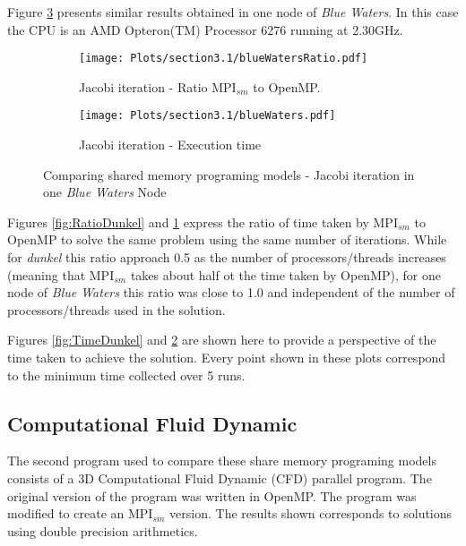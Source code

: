 Figure \ref{fig:Figure2} presents similar results obtained in one node of \emph{Blue Waters}. In this case the CPU is an AMD Opteron(TM) Processor 6276 running at 2.30GHz. 

\begin{figure} [h!]
    \centering
    \captionsetup{justification=raggedright, singlelinecheck=false}
    \begin{subfigure}{.6\textwidth}
      \hspace*{-1.5cm} 
      \texttt{[image: Plots/section3.1/blueWatersRatio.pdf]}
      \caption{Jacobi iteration - Ratio MPI$_{sm}$ to OpenMP.}
      \label{fig:RatioBW}
    \end{subfigure}%
    \begin{subfigure}{.6\textwidth}
      \hspace*{-1.5cm} 
      \texttt{[image: Plots/section3.1/blueWaters.pdf]}
      \caption{Jacobi iteration - Execution time}
      \label{fig:TimeBW}
    \end{subfigure}
\caption{Comparing shared memory programing models - Jacobi iteration in one \emph{Blue Waters} Node}
\label{fig:Figure2}
\end{figure}

\medskip


Figures \ref{fig:RatioDunkel} and \ref{fig:RatioBW} express the ratio of time taken by MPI$_{sm}$ to OpenMP to solve the same problem using the same number of iterations. While for \emph{dunkel} this ratio approach 0.5 as the number of processors/threads increases (meaning that MPI$_{sm}$ takes about half ot the time taken by OpenMP), for one node of \emph{Blue Waters} this ratio was close to 1.0 and independent of the number of processors/threads used in the solution.

\medskip

Figures \ref{fig:TimeDunkel} and \ref{fig:TimeBW} are shown here to provide a perspective of the time taken to achieve the solution. Every point shown in these plots correspond to the minimum time collected over 5 runs.
\medskip



\subsection*{Computational Fluid Dynamic}
The second program used to compare these share memory programing models consists of a 3D Computational Fluid Dynamic (CFD) parallel program. The original version of the program was written in OpenMP. The program was modified to create an MPI$_{sm}$ version. The results shown corresponds to solutions using double precision arithmetics. 

